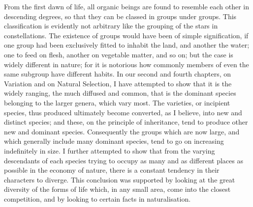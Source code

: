 \indent From the first dawn of life, all organic beings are found to resemble each other in descending degrees, so that they can be classed in groups under groups. This classification is evidently not arbitrary like the grouping of the stars in constellations. The existence of groups would have been of simple signification, if one group had been exclusively fitted to inhabit the land, and another the water; one to feed on flesh, another on vegetable matter, and so on; but the case is widely different in nature; for it is notorious how commonly members of even the same subgroup have different habits. In our second and fourth chapters, on Variation and on Natural Selection, I have attempted to show that it is the widely ranging, the much diffused and common, that is the dominant species belonging to the larger genera, which vary most. The varieties, or incipient species, thus produced ultimately become converted, as I believe, into new and distinct species; and these, on the principle of inheritance, tend to produce other new and dominant species. Consequently the groups which are now large, and which generally include many dominant species, tend to go on increasing indefinitely in size. I further attempted to show that from the varying descendants of each species trying to occupy as many and as different places as possible in the economy of nature, there is a constant tendency in their characters to diverge. This conclusion was supported by looking at the great diversity of the forms of life which, in any small area, come into the closest competition, and by looking to certain facts in naturalisation.~\\
